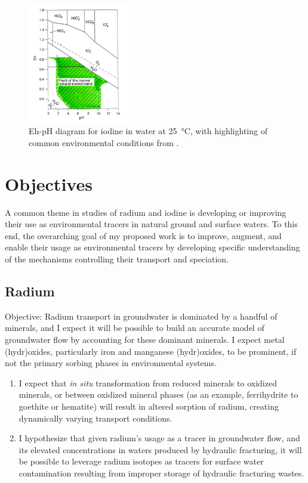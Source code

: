\documentclass[twoside,12pt,titlepage]{article}
\begin{document}
\begin{figure}[h]
\centering
\includegraphics[width = 0.4\textwidth]{IodineSpeciation.png}
\caption{Eh-pH diagram for iodine in water at \SI{25}{\degreeCelsius}, with highlighting of common environmental conditions from \cite{Hou2009}.}
\label{fig:IodineSpeciation}
\end{figure}

\section{Objectives}

A common theme in studies of radium and iodine is developing or improving their use as environmental tracers in natural ground and surface waters. To this end, the overarching goal of my proposed work is to improve, augment, and enable their usage as environmental tracers by developing specific understanding of the mechanisms controlling their transport and speciation.
\subsection{Radium}

Objective: Radium transport in groundwater is dominated by a handful of minerals, and I expect it will be possible to build an accurate model of groundwater flow by accounting for these dominant minerals. I expect metal (hydr)oxides, particularly iron and manganese (hydr)oxides, to be prominent, if not the primary sorbing phases in environmental systems.

\begin{enumerate}[label=\arabic*)]
	\item I expect that \textit{in situ} transformation from reduced minerals to oxidized minerals, or between oxidized mineral phases (as an example, ferrihydrite to goethite or hematite) will result in altered sorption of radium, creating dynamically varying transport conditions.
	\item I hypothesize that given radium's usage as a tracer in groundwater flow, and its elevated concentrations in waters produced by hydraulic fracturing, it will be possible to leverage radium isotopes as tracers for surface water contamination resulting from improper storage of hydraulic fracturing wastes.
\end{enumerate}
\end{document}
